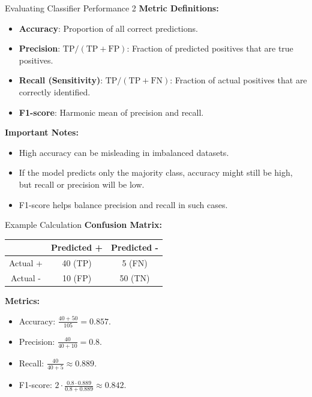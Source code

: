 \documentclass{beamer}
\begin{document}
\begin{frame}{Evaluating Classifier Performance 2}
  \textbf{Metric Definitions:}
  \begin{itemize}
    \item \textbf{Accuracy}: Proportion of all correct predictions.
    \item \textbf{Precision}: \( \text{TP} / (\text{TP} + \text{FP}) \): Fraction of predicted positives that are true positives.
    \item \textbf{Recall (Sensitivity)}: \( \text{TP} / (\text{TP} + \text{FN}) \): Fraction of actual positives that are correctly identified.
    \item \textbf{F1-score}: Harmonic mean of precision and recall.
  \end{itemize}
  \vspace{1em}
  \textbf{Important Notes:}
  \begin{itemize}
    \item High accuracy can be misleading in imbalanced datasets.
    \item If the model predicts only the majority class, accuracy might still be high, but recall or precision will be low.
    \item F1-score helps balance precision and recall in such cases.
  \end{itemize}
\end{frame}

\begin{frame}{Example Calculation}
  \textbf{Confusion Matrix:}
  \begin{table}[h]
    \centering
    \begin{tabular}{|c|c|c|}
      \hline
      & Predicted + & Predicted - \\
      \hline
      Actual + & 40 (TP) & 5 (FN) \\
      \hline
      Actual - & 10 (FP) & 50 (TN) \\
      \hline
    \end{tabular}
  \end{table}
  \textbf{Metrics:}
  \begin{itemize}
    \item Accuracy: \( \frac{40 + 50}{105} = 0.857 \).
    \item Precision: \( \frac{40}{40 + 10} = 0.8 \).
    \item Recall: \( \frac{40}{40 + 5} \approx 0.889 \).
    \item F1-score: \( 2 \cdot \frac{0.8 \cdot 0.889}{0.8 + 0.889} \approx 0.842 \).
  \end{itemize}
\end{frame}
\end{document}
